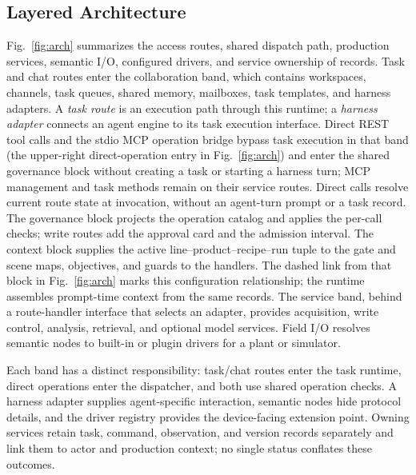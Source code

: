 \subsection{Layered Architecture}
\label{sec:layers}
\label{sec:arch}
Fig.~\ref{fig:arch} summarizes the access routes, shared dispatch path,
production services, semantic I/O, configured drivers, and service ownership
of records. Task and chat routes enter the
collaboration band, which contains workspaces, channels, task queues, shared
memory, mailboxes, task templates, and harness adapters. A \emph{task route}
is an execution path through this runtime; a \emph{harness adapter} connects
an agent engine to its task execution interface. Direct REST tool
calls and the stdio MCP operation bridge bypass task execution in that band
(the upper-right direct-operation entry in
Fig.~\ref{fig:arch}) and enter the shared governance block without creating a
task or starting a harness turn; MCP management and task methods remain on
their service routes. Direct calls resolve current route state at invocation,
without an agent-turn prompt or a task record.
The governance block projects the operation catalog and applies the per-call
checks; write routes add the approval card and the admission interval. The
context block supplies the active line--product--recipe--run tuple to the gate
and scene maps, objectives, and guards to the handlers. The dashed link from
that block in Fig.~\ref{fig:arch} marks this configuration relationship; the
runtime assembles prompt-time context from the same records. The service band,
behind a route-handler interface that selects an adapter, provides
acquisition, write control, analysis, retrieval, and optional model services.
Field I/O resolves semantic nodes to built-in or plugin drivers for a plant or
simulator.

Each band has a distinct responsibility: task/chat routes enter the task
runtime, direct operations enter the dispatcher, and both use shared operation
checks. A harness adapter supplies agent-specific interaction, semantic nodes
hide protocol details, and the driver registry provides the device-facing
extension point. Owning services retain task, command, observation, and
version records separately and link them to actor and production context; no
single status conflates these outcomes.

